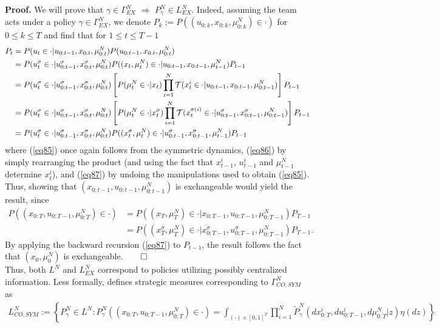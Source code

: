 \documentclass[12pt, oneside]{report}
\newcommand{\1}[1]{\mathbbm{1}_{\{#1\}}}
\newcommand{\mc}[1]{\mathcal{#1}}
\theoremstyle{definition}
\begin{document}
\noindent\textbf{Proof.} We will prove that $\gamma\in\Gamma^N_{EX}$
$\Rightarrow$ $P^N_\gamma\in L^N_{EX}$. Indeed, assuming the team acts under a
policy $\gamma\in\Gamma^N_{EX}$, we denote
$P_k:=P((u_{0:k},x_{0:k},\mu^N_{0:k})\in\cdot)$ for $0\leq k\leq T$ and find
that for $1\leq t\leq T-1$
\begin{align}
    P_t&=P(u_t\in\cdot|u_{0:t-1},x_{0:t},\mu^N_{0:t})P(u_{0:t-1},x_{0:t},\mu^N_{0:t})\notag\\
    &=P(u^\sigma_t\in\cdot|u^\sigma_{0:t-1},x^\sigma_{0:t},\mu^N_{0:t})P((x_t,\mu^N_t)\in\cdot|u_{0:t-1},x_{0:t-1},\mu^N_{t-1})P_{t-1}\\
    &=P(u^\sigma_t\in\cdot|u^\sigma_{0:t-1},x^\sigma_{0:t},\mu^N_{0:t})\left[P(\mu^N_t\in\cdot|x_t)\prod_{i=1}^N\mc{T}(x^i_t\in\cdot|u_{0:t-1},x_{0:t-1},\mu^N_{0:t-1})\right]P_{t-1}\label{eq85}\\
    &=P(u^\sigma_t\in\cdot|u^\sigma_{0:t-1},x^\sigma_{0:t},\mu^N_{0:t})\left[P(\mu^N_t\in\cdot|x^\sigma_t)\prod_{i=1}^N\mc{T}(x^{\sigma(i)}_t\in\cdot|u^\sigma_{0:t-1},x^\sigma_{0:t-1},\mu^N_{0:t-1})\right]P_{t-1}\label{eq86}\\
    &=P(u^\sigma_t\in\cdot|u^\sigma_{0:t-1},x^\sigma_{0:t},\mu^N_{0:t})P((x^\sigma_t,\mu^N_t)\in\cdot|u^\sigma_{0:t-1},x^\sigma_{0:t-1},\mu^N_{t-1})P_{t-1}\label{eq87}
\end{align}
where (\ref{eq85}) once again follows from the symmetric dynamics, (\ref{eq86})
by simply rearranging the product (and using the fact that $x^i_{t-1}$,
$u^i_{t-1}$ and $\mu^N_{t-1}$ determine $x^i_t$), and (\ref{eq87}) by undoing
the manipulations used to obtain (\ref{eq85}). Thus, showing that
$(x_{0:t-1},u_{0:t-1},\mu^N_{0:t-1})$ is exchangeable would yield the result,
since
\begin{align*}
    P((x_{0:T},u_{0:T-1},\mu^N_{0:T})\in\cdot)&=P((x_T,\mu^N_T)\in\cdot|x_{0:T-1},u_{0:T-1},\mu^N_{0:T-1})P_{T-1}\\
    &=P((x^\sigma_T,\mu^N_T)\in\cdot|x^\sigma_{0:T-1},u_{0:T-1}^\sigma,\mu^N_{0:T-1})P_{T-1}.
\end{align*}
By applying the backward recursion (\ref{eq87}) to $P_{t-1}$, the result follows
the fact that $(x_0,\mu^N_0)$ is exchangeable.\hfill{$\qed$}\\[5pt]
\indent Thus, both $L^N$ and $L^N_{EX}$ correspond to policies utilizing
possibly centralized information. Less formally,
\cite{Sanjari_Saldi_Yüksel_2024} defines strategic measures corresponding to
$\Gamma^N_{CO,\mathit{SYM}}$ as
\begin{align*}
    L^N_{CO,\mathit{SYM}}:=\left\{P^N_\gamma\in L^N:P^N_\gamma((x_{0:T},u_{0:T-1},\mu^N_{0:T})\in\cdot)=\int_{(\cdot)\times[0,1]^T}\prod_{i=1}^N\widetilde{P}^N_\gamma(dx^i_{0:T},du^i_{0:T-1},d\mu^N_{0:T}|z)\eta(dz)\right\}
\end{align*}
\end{document}

